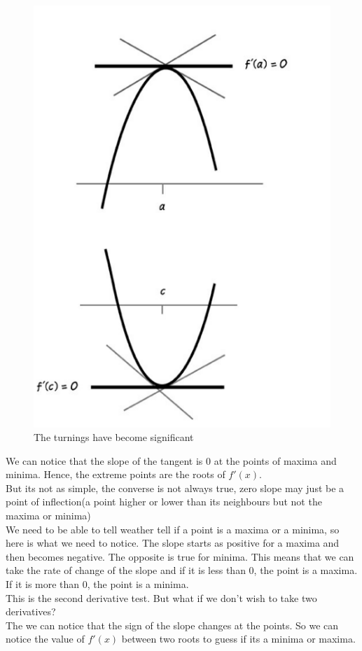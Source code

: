 \begin{figure} [h]
    \centering
    \includegraphics[width=0.75\linewidth]{Photos/Optimization zero slope.png}
    \caption{The turnings have become significant}
    
\end{figure}
We can notice that the slope of the tangent is $0$ at the points of maxima and minima. Hence, the extreme points are the roots of $f'(x)$.\\
But its not as simple, the converse is not always true, zero slope may just be a point of inflection(a point higher or lower than its neighbours but not the maxima or minima)\\
We need to be able to tell weather tell if a point is a maxima or a minima, so here is what we need to notice. The slope starts as positive for a maxima and then becomes negative. The opposite is true for minima. This means that we can take the rate of change of the slope and if it is less than $0$, the point is a maxima. If it is more than $0$, the point is a minima.\\
This is the second derivative test. But what if we don't wish to take two derivatives?\\
The we can notice that the sign of the slope changes at the points. So we can notice the value of $f'(x)$ between two roots to guess if its a minima or maxima.\\
